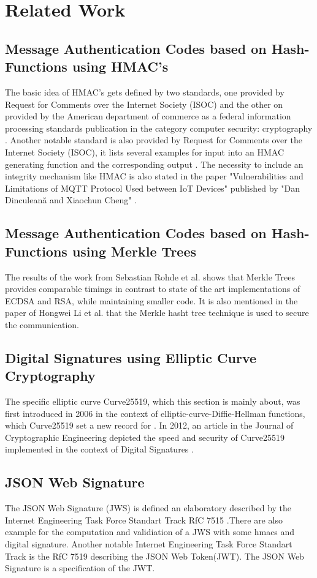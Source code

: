 \section{Related Work}

\subsection{Message Authentication Codes based on Hash-Functions using HMAC's}

The basic idea of HMAC’s gets defined by two standards, one provided by Request for Comments over the Internet Society (ISOC) \cite{RFC} and the other on provided by the American department of commerce as a federal information processing standards publication in the category computer security: cryptography \cite{FIBS}. Another notable standard is also provided by Request for Comments over the Internet Society (ISOC), it lists several examples for input into an HMAC generating function and the corresponding output \cite{RFC2}. The necessity to include an integrity mechanism like HMAC is also stated in the paper "Vulnerabilities and Limitations of MQTT Protocol
Used between IoT Devices" published by "Dan Dinculeană and Xiaochun Cheng" \cite{LIMI}.

\subsection{Message Authentication Codes based on Hash-Functions using Merkle Trees}
The results of the work from Sebastian Rohde et al. shows that Merkle Trees provides comparable timings in contrast to state of the art implementations of ECDSA and RSA, while maintaining smaller code. \cite{FHB} It is also mentioned in the paper of Hongwei Li et al. that the Merkle hasht tree technique is used to secure the communication. \cite{METR}

\subsection{Digital Signatures using Elliptic Curve Cryptography}
The specific elliptic curve Curve25519, which this section is mainly about, was first introduced in 2006 in the context of elliptic-curve-Diffie-Hellman functions, which Curve25519 set a new record for \cite{ECDH}. In 2012, an article in the Journal of Cryptographic Engineering depicted the speed and security of Curve25519 implemented in the context of Digital Signatures \cite{Curve25519}.

\subsection{JSON Web Signature}
The JSON Web Signature (JWS) is defined an elaboratory described by the Internet Engineering Task Force Standart Track RfC 7515 \cite{rfc7515}.There are also example for the computation and validiation of a JWS with some hmacs and digital signature. Another notable Internet Engineering Task Force Standart Track is the RfC 7519 \cite{rfc7519}describing the JSON Web Token(JWT). The JSON Web Signature is a specification of the JWT.
